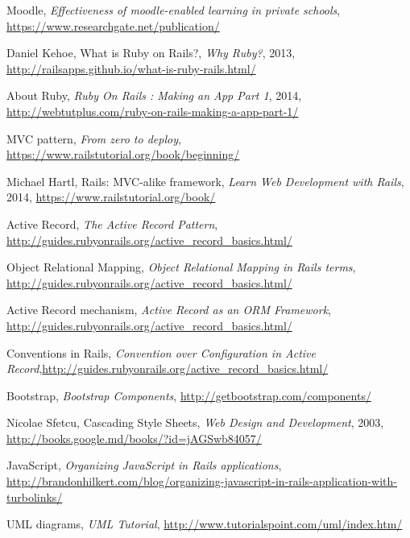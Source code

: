 \begin{thebibliography}{99999}
\singlespace\normalsize

 Moodle, \textit{Effectiveness of moodle-enabled learning in private schools}, \url{https://www.researchgate.net/publication/} %

 Daniel Kehoe, What is Ruby on Rails?, \textit{Why Ruby?}, 2013, \url{http://railsapps.github.io/what-is-ruby-rails.html/} %

 About Ruby, \textit{Ruby On Rails : Making an App Part 1}, 2014, \url{http://webtutplus.com/ruby-on-rails-making-a-app-part-1/} %

 MVC pattern, \textit{From zero to deploy}, \url{https://www.railstutorial.org/book/beginning/} %

 Michael Hartl, Rails:  MVC-alike framework, \textit{Learn Web Development with Rails}, 2014, \url{https://www.railstutorial.org/book/} %

 Active Record, \textit{The Active Record Pattern}, \url{http://guides.rubyonrails.org/active_record_basics.html/} %

 Object Relational Mapping, \textit{Object Relational Mapping in Rails terms}, \url{http://guides.rubyonrails.org/active_record_basics.html/} %

 Active Record  mechanism, \textit{Active Record as an ORM Framework}, \url{http://guides.rubyonrails.org/active_record_basics.html/} %

 Conventions in Rails, \textit{Convention over Configuration in Active Record},\url{http://guides.rubyonrails.org/active_record_basics.html/} %

 Bootstrap, \textit{Bootstrap Components}, \url{http://getbootstrap.com/components/} %

 Nicolae Sfetcu, Cascading Style Sheets, \textit{Web Design and Development}, 2003, \url{http://books.google.md/books/?id=jAGSwb84057/} %

 JavaScript, \textit{Organizing JavaScript in Rails applications}, \url{http://brandonhilkert.com/blog/organizing-javascript-in-rails-application-with-turbolinks/} %

 UML diagrams, \textit{UML Tutorial}, \url{http://www.tutorialspoint.com/uml/index.htm/} %

\end{thebibliography}

